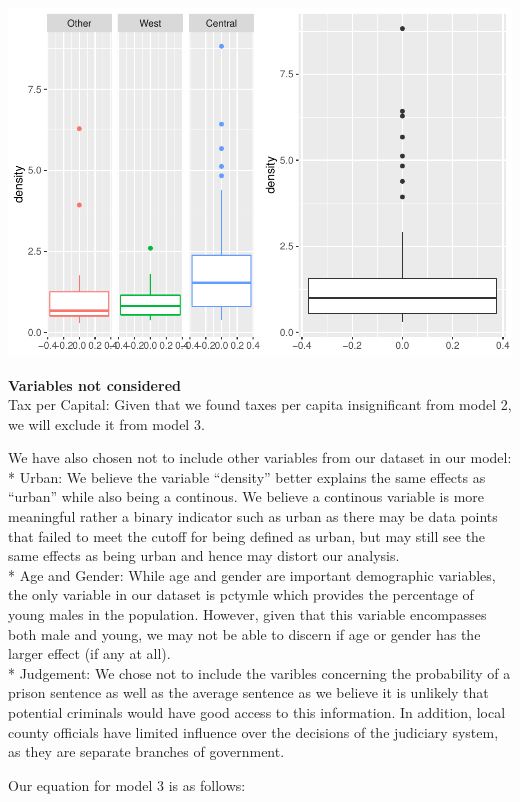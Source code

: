 \documentclass[]{article}
\begin{document}
\includegraphics{Bagnard_Gaustad_Hartman_Leung_Lab_3_files/figure-latex/unnamed-chunk-78-1.pdf}

\textbf{Variables not considered}\\
Tax per Capital: Given that we found taxes per capita insignificant from
model 2, we will exclude it from model 3.

We have also chosen not to include other variables from our dataset in
our model:\\
* Urban: We believe the variable ``density'' better explains the same
effects as ``urban'' while also being a continous. We believe a
continous variable is more meaningful rather a binary indicator such as
urban as there may be data points that failed to meet the cutoff for
being defined as urban, but may still see the same effects as being
urban and hence may distort our analysis.\\
* Age and Gender: While age and gender are important demographic
variables, the only variable in our dataset is pctymle which provides
the percentage of young males in the population. However, given that
this variable encompasses both male and young, we may not be able to
discern if age or gender has the larger effect (if any at all).\\
* Judgement: We chose not to include the varibles concerning the
probability of a prison sentence as well as the average sentence as we
believe it is unlikely that potential criminals would have good access
to this information. In addition, local county officials have limited
influence over the decisions of the judiciary system, as they are
separate branches of government.

Our equation for model 3 is as follows:
\end{document}
